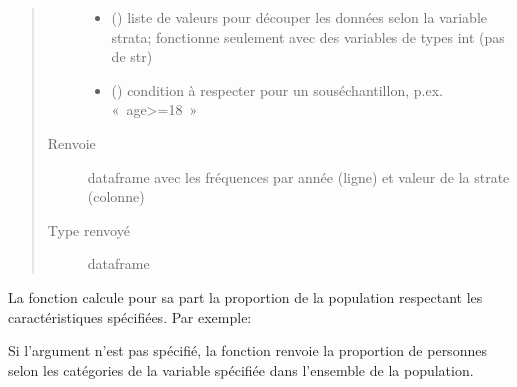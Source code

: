 \documentclass[letterpaper,10pt,french]{sphinxmanual}
\begin{document}
\begin{fulllineitems}
\begin{fulllineitems}
\begin{quote}
\begin{description}
\begin{itemize}
\item {} 
 () \textendash{} liste de valeurs pour découper les données selon la variable strata; fonctionne seulement avec des variables de types int (pas de str)

\item {} 
 () \textendash{} condition à respecter pour un sous\sphinxhyphen{}échantillon, p.ex. « age\textgreater{}=18 »

\end{itemize}

\item[{Renvoie}] \leavevmode
dataframe avec les fréquences par année (ligne) et valeur de la strate (colonne)

\item[{Type renvoyé}] \leavevmode
dataframe

\end{description}\end{quote}

\end{fulllineitems}


\end{fulllineitems}


\begin{DUlineblock}{0em}
\item[] 
\end{DUlineblock}


La fonction  calcule pour sa part la proportion de la population respectant les caractéristiques spécifiées. Par exemple:

\begin{sphinxVerbatim}[commandchars=\\\{\}]
   
\end{sphinxVerbatim}

Si l’argument  n’est pas spécifié, la fonction renvoie la proportion de personnes selon les catégories de la variable spécifiée dans l’ensemble de la population.
\end{document}
